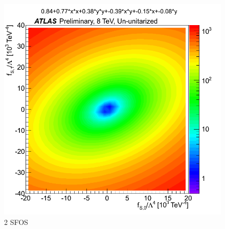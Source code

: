 \begin{figure}[tb]
\centering
\includegraphics[width=.7\textwidth]{figures/aqgc_fits/2SFOS/3lUnUnit_2SFOS.png}
\caption{2 SFOS}
\label{fig:aqgc_fit_2sfos_ununit}
\end{figure}

